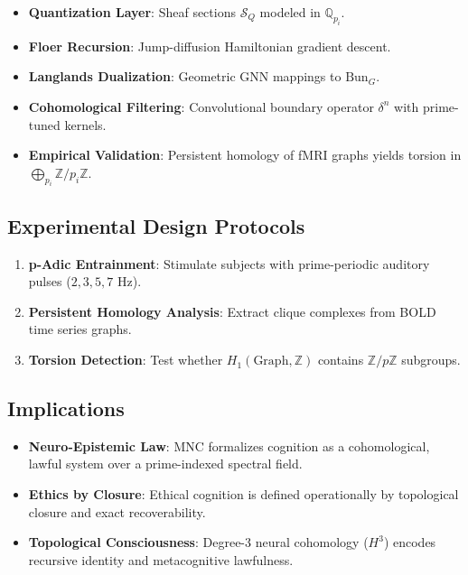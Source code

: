 \documentclass{article}
\theoremstyle{plain}
\begin{document}
\begin{itemize}
    \item \textbf{Quantization Layer}: Sheaf sections $\mathcal{S}_Q$ modeled in $\mathbb{Q}_{p_i}$.
    \item \textbf{Floer Recursion}: Jump-diffusion Hamiltonian gradient descent.
    \item \textbf{Langlands Dualization}: Geometric GNN mappings to $\text{Bun}_G$.
    \item \textbf{Cohomological Filtering}: Convolutional boundary operator $\delta^n$ with prime-tuned kernels.
    \item \textbf{Empirical Validation}: Persistent homology of fMRI graphs yields torsion in $\bigoplus_{p_i} \mathbb{Z}/p_i\mathbb{Z}$.
\end{itemize}

\subsection{Experimental Design Protocols}

\begin{enumerate}
    \item \textbf{p-Adic Entrainment}: Stimulate subjects with prime-periodic auditory pulses ($2, 3, 5, 7$ Hz).
    \item \textbf{Persistent Homology Analysis}: Extract clique complexes from BOLD time series graphs.
    \item \textbf{Torsion Detection}: Test whether $H_1(\text{Graph}, \mathbb{Z})$ contains $\mathbb{Z}/p\mathbb{Z}$ subgroups.
\end{enumerate}

\subsection{Implications}

\begin{itemize}
    \item \textbf{Neuro-Epistemic Law}: MNC formalizes cognition as a cohomological, lawful system over a prime-indexed spectral field.
    \item \textbf{Ethics by Closure}: Ethical cognition is defined operationally by topological closure and exact recoverability.
    \item \textbf{Topological Consciousness}: Degree-3 neural cohomology ($H^3$) encodes recursive identity and metacognitive lawfulness.
\end{itemize}
\end{document}
